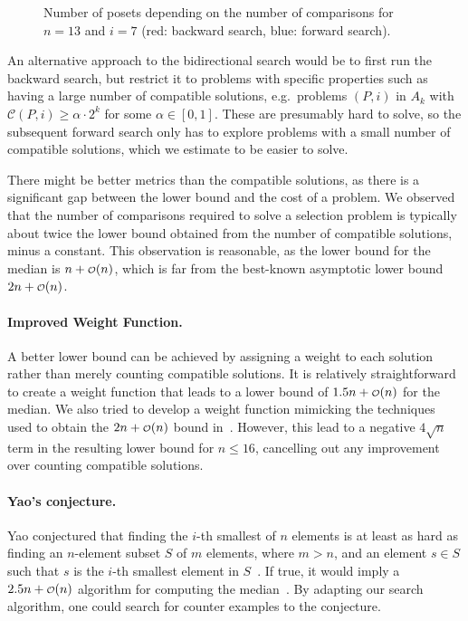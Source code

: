 \documentclass[twoside,leqno,twocolumn]{article}
\newcommand\smallO{
\mathchoice
{{\scriptstyle\mathcal{O}}}%
{{\scriptstyle\mathcal{O}}}%
{{\scriptscriptstyle\mathcal{O}}}%
{\scalebox{.50}{$\scriptscriptstyle\mathcal{O}$}}%
}
\begin{document}
\begin{figure}[!b]
  \centering
  
  \caption{Number of posets depending on the number of comparisons for $n = 13$ and $i = 7$ (red: backward search, blue: forward search).}
  \label{fig:backward_forward_count_13_6}
\end{figure}

An alternative approach to the bidirectional search would be to first run the backward search, but restrict it to problems with specific properties such as having a large number of compatible solutions, e.g.\ problems $(P, i)$ in $A_k$ with $\mathcal{C}(P, i) \ge \alpha \cdot 2^k$ for some $\alpha \in [0, 1]$.
These are presumably hard to solve, so the subsequent forward search only has to explore problems with a small number of compatible solutions, which we estimate to be easier to solve.

There might be better metrics than the compatible solutions, as there is a significant gap between the lower bound and the cost of a problem.
We observed that the number of comparisons required to solve a selection problem is typically about twice the lower bound obtained from the number of compatible solutions, minus a constant.
This observation is reasonable, as the lower bound for the median is $n + \smallO(n)$, which is far from the best-known asymptotic lower bound $2n + \smallO(n)$.

\paragraph{Improved Weight Function.}
A better lower bound can be achieved by assigning a weight to each solution rather than merely counting compatible solutions.
It is relatively straightforward to create a weight function that leads to a lower bound of $1.5n + \smallO(n)$ for the median.
We also tried to develop a weight function mimicking the techniques used to obtain the $2n + \smallO(n)$ bound in~\cite{bent1985finding}.
However, this lead to a negative $4\sqrt{n}$ term in the resulting lower bound for $n \leq 16$, cancelling out any improvement over counting compatible solutions.
\enlargethispage{\baselineskip}

\paragraph{Yao's conjecture.}
Yao conjectured that finding the $i$-th smallest of $n$ elements is at least as hard as finding an $n$-element subset $S$ of $m$ elements, where $m > n$, and an element $s \in S$ such that $s$ is the $i$-th smallest element in $S$~\cite{yao1974lower}.
If true, it would imply a $2.5n + \smallO(n)$ algorithm for computing the median~\cite{schonhage1975finding}.
By adapting our search algorithm, one could search for counter examples to the conjecture.
\end{document}
